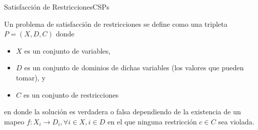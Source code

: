 \documentclass[spanish, c]{beamer}
\begin{document}
\begin{frame}{Satisfacción de Restricciones}{CSPs}

    Un problema de \alert{satisfacción de restricciones} se define como una tripleta $P = (X, D, C)$ donde

    \begin{itemize}
        \item $X$ es un conjunto de variables,
        \item $D$ es un conjunto de dominios de dichas variables (los valores que pueden tomar), y
        \item $C$ es un conjunto de restricciones
    \end{itemize}

    en donde la solución es verdadera o falsa dependiendo de la existencia de un mapeo $f \colon X_i \to D_i, \forall i \in X, i \in D$ en el que ninguna restricción $c \in C$ sea violada.
    
\end{frame}


\end{document}
